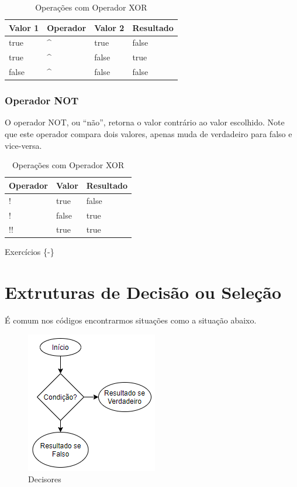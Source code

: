 \documentclass[
]{book}
\begin{document}
\begin{table}

\caption{\label{tab:unnamed-chunk-11}Operações com Operador XOR}
\centering
\begin{tabular}[t]{l|l|l|l}
\hline
Valor 1 & Operador & Valor 2 & Resultado\\
\hline
true & \textasciicircum{} & true & false\\
\hline
true & \textasciicircum{} & false & true\\
\hline
false & \textasciicircum{} & false & false\\
\hline
\end{tabular}
\end{table}

\hypertarget{operador-not}{%
\subsection{Operador NOT}\label{operador-not}}

O operador NOT, ou ``não'', retorna o valor contrário ao valor escolhido. Note que este operador compara dois valores, apenas muda de verdadeiro para falso e vice-versa.

\begin{table}

\caption{\label{tab:unnamed-chunk-12}Operações com Operador XOR}
\centering
\begin{tabular}[t]{l|l|l}
\hline
Operador & Valor & Resultado\\
\hline
! & true & false\\
\hline
! & false & true\\
\hline
!! & true & true\\
\hline
\end{tabular}
\end{table}

Exercícios \{-\}

\hypertarget{extruturas-de-decisuxe3o-ou-seleuxe7uxe3o}{%
\chapter{Extruturas de Decisão ou Seleção}\label{extruturas-de-decisuxe3o-ou-seleuxe7uxe3o}}

É comum nos códigos encontrarmos situações como a situação abaixo.

\begin{figure}
\centering
\includegraphics{imagens/decisores.png}
\caption{Decisores}
\end{figure}
\end{document}
